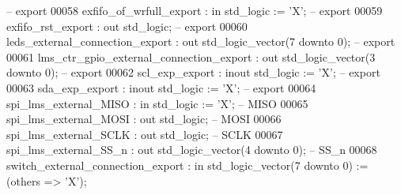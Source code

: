 \begin{DoxyCode}
{      -- export}
00058          exfifo_of_wrfull_export                 : \textcolor{keywordflow}{in}    \textcolor{comment}{std\_logic}                    := 'X';             \textcolor{keyword}{
      -- export}
00059          exfifo_rst_export                       : \textcolor{keywordflow}{out}   \textcolor{comment}{std\_logic};                                       \textcolor{keyword}{
      -- export}
00060          leds_external_connection_export         : \textcolor{keywordflow}{out}   \textcolor{comment}{std\_logic\_vector}(\textcolor{vhdllogic}{}\textcolor{vhdllogic}{7} \textcolor{keywordflow}{downto} \textcolor{vhdllogic}{}\textcolor{vhdllogic}{0});                    \textcolor{keyword}{
      -- export}
00061          lms_ctr_gpio_external_connection_export : \textcolor{keywordflow}{out}   \textcolor{comment}{std\_logic\_vector}(\textcolor{vhdllogic}{}\textcolor{vhdllogic}{3} \textcolor{keywordflow}{downto} \textcolor{vhdllogic}{}\textcolor{vhdllogic}{0});                    \textcolor{keyword}{
      -- export}
00062          scl_exp_export                          : \textcolor{keywordflow}{inout} \textcolor{comment}{std\_logic}                    := 'X';             \textcolor{keyword}{
      -- export}
00063          sda_exp_export                          : \textcolor{keywordflow}{inout} \textcolor{comment}{std\_logic}                    := 'X';             \textcolor{keyword}{
      -- export}
00064          spi_lms_external_MISO                   : \textcolor{keywordflow}{in}    \textcolor{comment}{std\_logic}                    := 'X';             \textcolor{keyword}{
      -- MISO}
00065          spi_lms_external_MOSI                   : \textcolor{keywordflow}{out}   \textcolor{comment}{std\_logic};                                       \textcolor{keyword}{
      -- MOSI}
00066          spi_lms_external_SCLK                   : \textcolor{keywordflow}{out}   \textcolor{comment}{std\_logic};                                       \textcolor{keyword}{
      -- SCLK}
00067          spi_lms_external_SS_n                   : \textcolor{keywordflow}{out}   \textcolor{comment}{std\_logic\_vector}(\textcolor{vhdllogic}{}\textcolor{vhdllogic}{4} \textcolor{keywordflow}{downto} \textcolor{vhdllogic}{}\textcolor{vhdllogic}{0});                    \textcolor{keyword}{
      -- SS\_n}
00068          switch_external_connection_export       : \textcolor{keywordflow}{in}    \textcolor{comment}{std\_logic\_vector}(\textcolor{vhdllogic}{}\textcolor{vhdllogic}{7} \textcolor{keywordflow}{downto} \textcolor{vhdllogic}{}\textcolor{vhdllogic}{0}) := (\textcolor{keywordflow}{others} => 'X'); \textcolor{keyword}{
}
\end{DoxyCode}
